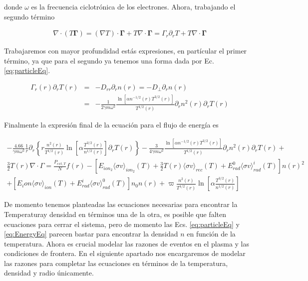 donde $\omega$ es la frecuencia ciclotr\'onica de los electrones. Ahora, trabajando el segundo t\'ermino

\begin{eqnarray}
  \nabla\cdot(T\pmb{\Gamma}) = (\nabla T) \cdot \pmb{\Gamma} + T\nabla\cdot\pmb{\Gamma} = \Gamma_r\partial_r T + T\nabla\cdot{\pmb{\Gamma}}
\end{eqnarray}

Trabajaremos con mayor profundidad est\'as expresiones, en part\'icular el primer t\'ermino, ya que para el segundo ya tenemos una forma dada por Ec. \eqref{eq:particleEq}. 

\begin{eqnarray}
  \Gamma_r(r)\partial_rT(r) &=& -D_{rr}\partial_r n(r) = -D_\perp\partial_r n(r) \nonumber\\
                            &=& -\frac{1}{2\gamma m\omega^2}\frac{\ln\left[\alpha n^{-1/2}(r)T^{3/2}(r)\right]}{T^{1/2}(r)}\partial_r n^2(r)\partial_r T(r)
\end{eqnarray}

Finalmente la expresi\'on final de la ecuaci\'on para el flujo de energ\'ia es

\begin{eqnarray}
 -\frac{4.66}{\gamma m\omega^2}\frac{1}{r}\partial_r\left\{r \frac{n^2(r)}{T^{1/2}(r)}\ln\left[\alpha \frac{T^{3/2}(r)}{n^{1/2}(r)}\right] \partial_r T(r)\right\} - \frac{3}{4\gamma m\omega^2}\frac{\ln\left[\alpha n^{-1/2}(r)T^{3/2}(r)\right]}{T^{1/2}(r)}\partial_r n^2(r)\partial_r T(r) \nonumber + \nonumber\\
 \frac{3}{2}T(r)\nabla\cdot\Gamma =  \frac{P_{ext,T}}{N}f(r) -  [E_{ion_2}\langle\sigma v\rangle_{ion_2}(T) + \frac{3}{2}T(r)\langle\sigma v\rangle_{rec}(T) + E_{rad}^0\langle\sigma v\rangle_{rad}^i(T)]n(r)^2 \nonumber \\ + [E_ion\langle\sigma v\rangle_{ion}(T)+ E_{rad}^i\langle\sigma v\rangle_{rad}^0(T)]n_0n(r) + \varpi\frac{n^2(r)}{T^{1/2}(r)}\ln\left[\alpha \frac{T^{3/2}(r)}{n^{1/2}(r)}\right]\label{eq:EnergyEq}
\end{eqnarray}

De momento tenemos planteadas las ecuaciones necesarias para encontrar la Temperaturay densidad en t\'erminos una de la otra, es posible que falten ecuaciones para cerrar el sistema, pero de momento las Ecs. \eqref{eq:particleEq} y \eqref{eq:EnergyEq} parecen bastar para encontrar la densidad $n$ en funci\'on de la temperatura. Ahora es crucial modelar las razones de eventos en el plasma y las condiciones de frontera. En el siguiente apartado nos encargaremos de modelar las razones para completar las ecuaciones en t\'erminos de la temperatura, densidad y radio \'unicamente.
